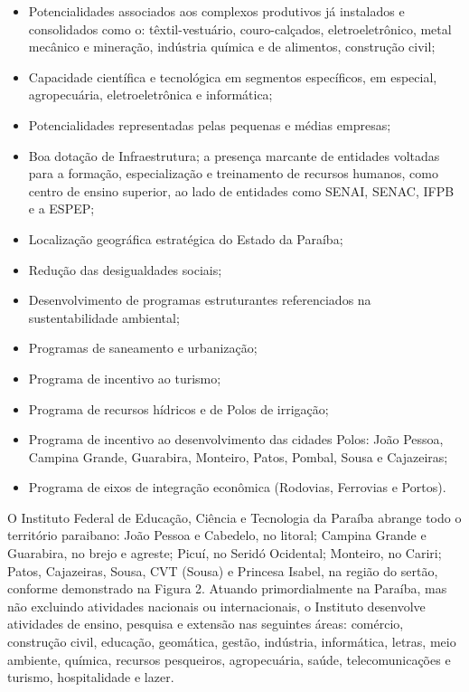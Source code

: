\begin{itemize}
  \item Potencialidades associados aos complexos produtivos já instalados e consolidados como o: têxtil-vestuário, couro-calçados, eletroeletrônico, metal mecânico e mineração, indústria química e de alimentos, construção civil;
  \item Capacidade científica e tecnológica em segmentos específicos, em especial, agropecuária, eletroeletrônica e informática;
  \item Potencialidades representadas pelas pequenas e médias empresas;
  \item Boa dotação de Infraestrutura; a presença marcante de entidades voltadas para a formação, especialização e treinamento de recursos humanos, como centro de ensino superior, ao lado de entidades como SENAI, SENAC, IFPB e a ESPEP;
  \item Localização geográfica estratégica do Estado da Paraíba;
  \item Redução das desigualdades sociais;
  \item Desenvolvimento de programas estruturantes referenciados na sustentabilidade ambiental;
  \item Programas de saneamento e urbanização;
  \item Programa de incentivo ao turismo;
  \item Programa de recursos hídricos e de Polos de irrigação;
  \item Programa de incentivo ao desenvolvimento das cidades Polos: João Pessoa, Campina Grande, Guarabira, Monteiro, Patos, Pombal, Sousa e Cajazeiras;
  \item Programa de eixos de integração econômica (Rodovias, Ferrovias e Portos).
\end{itemize}

O Instituto Federal de Educação, Ciência e Tecnologia da Paraíba abrange todo o território paraibano: João Pessoa e Cabedelo, no litoral; Campina Grande e Guarabira, no brejo e agreste; Picuí, no Seridó Ocidental; Monteiro, no Cariri; Patos, Cajazeiras, Sousa, CVT (Sousa) e Princesa Isabel, na região do sertão, conforme demonstrado na Figura 2. Atuando primordialmente na Paraíba, mas não excluindo atividades nacionais ou internacionais, o Instituto desenvolve atividades de ensino, pesquisa e extensão nas seguintes áreas: comércio, construção civil, educação, geomática, gestão, indústria, informática, letras, meio ambiente, química, recursos pesqueiros, agropecuária, saúde, telecomunicações e turismo, hospitalidade e lazer.

